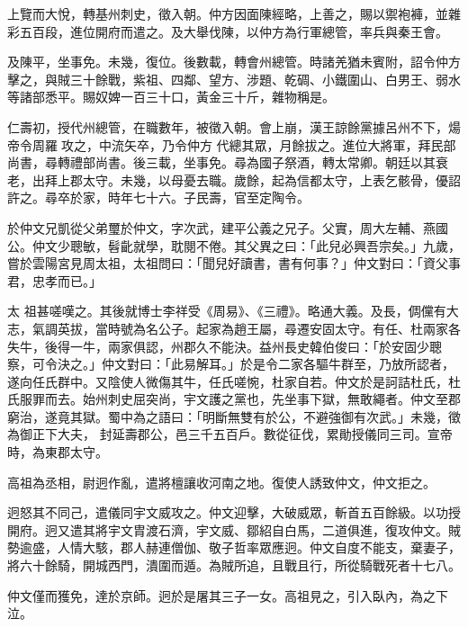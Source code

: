 \begin{pinyinscope}
 上覽而大悅，轉基州刺史，徵入朝。仲方因面陳經略，上善之，賜以禦袍褲，並雜彩五百段，進位開府而遣之。及大舉伐陳，以仲方為行軍總管，率兵與秦王會。



 及陳平，坐事免。未幾，復位。後數載，轉會州總管。時諸羌猶未賓附，詔令仲方擊之，與賊三十餘戰，紫祖、四鄰、望方、涉題、乾碉、小鐵圍山、白男王、弱水等諸部悉平。賜奴婢一百三十口，黃金三十斤，雜物稱是。



 仁壽初，授代州總管，在職數年，被徵入朝。會上崩，漢王諒餘黨據呂州不下，煬帝令周羅攻之，中流矢卒，乃令仲方
 代總其眾，月餘拔之。進位大將軍，拜民部尚書，尋轉禮部尚書。後三載，坐事免。尋為國子祭酒，轉太常卿。朝廷以其衰老，出拜上郡太守。未幾，以母憂去職。歲餘，起為信都太守，上表乞骸骨，優詔許之。尋卒於家，時年七十六。子民壽，官至定陶令。



 於仲文兄凱從父弟璽於仲文，字次武，建平公義之兄子。父實，周大左輔、燕國公。仲文少聰敏，髫齔就學，耽閱不倦。其父異之曰：「此兒必興吾宗矣。」九歲，嘗於雲陽宮見周太祖，太祖問曰：「聞兒好讀書，書有何事？」仲文對曰：「資父事君，忠孝而已。」



 太
 祖甚嗟嘆之。其後就博士李祥受《周易》、《三禮》。略通大義。及長，倜儻有大志，氣調英拔，當時號為名公子。起家為趙王屬，尋遷安固太守。有任、杜兩家各失牛，後得一牛，兩家俱認，州郡久不能決。益州長史韓伯俊曰：「於安固少聰察，可令決之。」仲文對曰：「此易解耳。」於是令二家各驅牛群至，乃放所認者，遂向任氏群中。又陰使人微傷其牛，任氏嗟惋，杜家自若。仲文於是訶詰杜氏，杜氏服罪而去。始州刺史屈突尚，宇文護之黨也，先坐事下獄，無敢繩者。仲文至郡窮治，遂竟其獄。蜀中為之語曰：「明斷無雙有於公，不避強御有次武。」未幾，徵為御正下大夫，
 封延壽郡公，邑三千五百戶。數從征伐，累勛授儀同三司。宣帝時，為東郡太守。



 高祖為丞相，尉迥作亂，遣將檀讓收河南之地。復使人誘致仲文，仲文拒之。



 迥怒其不同己，遣儀同宇文威攻之。仲文迎擊，大破威眾，斬首五百餘級。以功授開府。迥又遣其將宇文胄渡石濟，宇文威、鄒紹自白馬，二道俱進，復攻仲文。賊勢逾盛，人情大駭，郡人赫連僧伽、敬子哲率眾應迥。仲文自度不能支，棄妻子，將六十餘騎，開城西門，潰圍而遁。為賊所追，且戰且行，所從騎戰死者十七八。



 仲文僅而獲免，達於京師。迥於是屠其三子一女。高祖見之，引入臥內，為之下
 泣。




\end{pinyinscope}
